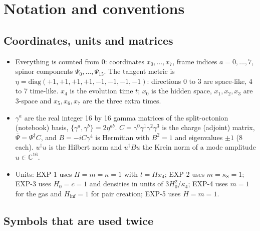\documentclass[11pt]{article}
\begin{document}
\section{Notation and conventions}

\subsection{Coordinates, units and matrices}

\begin{itemize}
\item Everything is counted from 0: coordinates $x_0,\dots,x_7$, frame indices $a=0,\dots,7$, spinor components $\Psi_0,\dots,\Psi_{15}$. The tangent metric is $\eta=\mathrm{diag}(+1,+1,+1,+1,-1,-1,-1,-1)$: directions 0 to 3 are space-like, 4 to 7 time-like. $x_4$ is the evolution time $t$; $x_0$ is the hidden space, $x_1,x_2,x_3$ are 3-space and $x_5,x_6,x_7$ are the three extra times.
\item $\gamma^a$ are the real integer 16 by 16 gamma matrices of the split-octonion (notebook) basis, $\{\gamma^a,\gamma^b\}=2\eta^{ab}$. $C=\gamma^0\gamma^1\gamma^2\gamma^3$ is the charge (adjoint) matrix, $\bar\Psi=\Psi^\dagger C$, and $B=-iC\gamma^4$ is Hermitian with $B^2=1$ and eigenvalues $\pm1$ (8 each). $u^\dagger u$ is the Hilbert norm and $u^\dagger Bu$ the Krein norm of a mode amplitude $u\in\mathbb C^{16}$.
\item Units: EXP-1 uses $H=m=\kappa=1$ with $t=Hx_4$; EXP-2 uses $m=\kappa_8=1$; EXP-3 uses $H_0=c=1$ and densities in units of $3H_0^2/\kappa_4$; EXP-4 uses $m=1$ for the gas and $H_{\mathrm{inf}}=1$ for pair creation; EXP-5 uses $H=m=1$.
\end{itemize}

\subsection{Symbols that are used twice}
\end{document}
